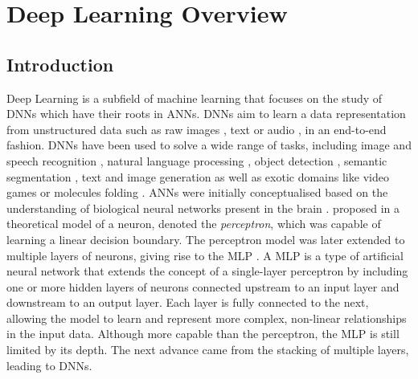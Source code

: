 \chapter{Deep Learning Overview}\label{chap:dlo}

\localtableofcontents

\section{Introduction}

Deep Learning is a subfield of machine learning that focuses on the study of
\acp{DNN} which have their roots in \acp{ANN}. \acp{DNN} aim to learn a data
representation from unstructured data such as raw images
\cite{DBLP:conf/nips/KrizhevskySH12}, text
\cite{DBLP:conf/emnlp/BudzianowskiV19} or audio
\cite{DBLP:journals/corr/HannunCCCDEPSSCN14}, in an end-to-end fashion.
\acp{DNN} have been used to solve a wide range of tasks, including image and
speech recognition
\cite{DBLP:conf/nips/KrizhevskySH12,DBLP:journals/corr/SimonyanZ14a,DBLP:conf/cvpr/HeZRS16,DBLP:journals/corr/HannunCCCDEPSSCN14,DBLP:conf/icassp/ChanJLV16,DBLP:conf/icml/AmodeiABCCCCCCD16},
natural language processing
\cite{DBLP:conf/emnlp/BudzianowskiV19,DBLP:conf/naacl/DevlinCLT19,DBLP:conf/nips/VaswaniSPUJGKP17},
object detection \cite{DBLP:conf/cvpr/RedmonDGF16,DBLP:conf/nips/RenHGS15},
semantic segmentation \cite{long2015fully,DBLP:conf/cvpr/LiuCSAHY019}, text and
image generation
\cite{goodfellow2020generative,karras2019style,DBLP:conf/emnlp/BudzianowskiV19}
as well as exotic domains like video games
\cite{silver2016mastering,silver2018general} or molecules folding
\cite{jumper2021highly}. \acp{ANN} were initially conceptualised based on the
understanding of biological neural networks present in the brain
\cite{mcculloch1943logical,hebb2005organization}.
\citeauthor{rosenblatt1958perceptron} proposed in
\cite{rosenblatt1958perceptron} a theoretical model of a neuron, denoted the
\emph{perceptron}, which was capable of learning a linear decision boundary. The
perceptron model was later extended to multiple layers of neurons, giving rise
to the \ac{MLP} \cite{rosenblatt1961principles,rumelhart1986learning}. A
\acl{MLP} is a type of artificial neural network that extends the concept of a
single-layer perceptron by including one or more hidden layers of neurons
connected upstream to an input layer and downstream to an output layer. Each
layer is fully connected to the next, allowing the model to learn and represent
more complex, non-linear relationships in the input data. Although more capable
than the perceptron, the \ac{MLP} is still limited by its depth. The next
advance came from the stacking of multiple layers, leading to \aclp{DNN}.\\

